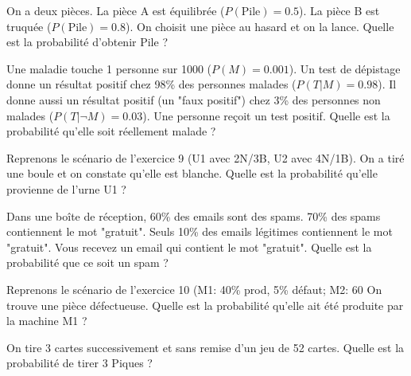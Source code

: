\begin{exercicebox}
On a deux pièces. La pièce A est équilibrée ($P(\text{Pile})=0.5$). La pièce B est truquée ($P(\text{Pile})=0.8$).
On choisit une pièce au hasard et on la lance. Quelle est la probabilité d'obtenir Pile ?
\end{exercicebox}


\begin{exercicebox}
Une maladie touche 1 personne sur 1000 ($P(M)=0.001$). Un test de dépistage donne un résultat positif chez 98\% des personnes malades ($P(T|M)=0.98$). Il donne aussi un résultat positif (un "faux positif") chez 3\% des personnes non malades ($P(T|\neg M)=0.03$).
Une personne reçoit un test positif. Quelle est la probabilité qu'elle soit réellement malade ?
\end{exercicebox}

\begin{exercicebox}
Reprenons le scénario de l'exercice 9 (U1 avec 2N/3B, U2 avec 4N/1B).
On a tiré une boule et on constate qu'elle est blanche. Quelle est la probabilité qu'elle provienne de l'urne U1 ?
\end{exercicebox}

\begin{exercicebox}
Dans une boîte de réception, 60\% des emails sont des spams. 70\% des spams contiennent le mot "gratuit". Seuls 10\% des emails légitimes contiennent le mot "gratuit".
Vous recevez un email qui contient le mot "gratuit". Quelle est la probabilité que ce soit un spam ?
\end{exercicebox}

\begin{exercicebox}
Reprenons le scénario de l'exercice 10 (M1: 40\% prod, 5\% défaut; M2: 60%
On trouve une pièce défectueuse. Quelle est la probabilité qu'elle ait été produite par la machine M1 ?
\end{exercicebox}


\begin{exercicebox}
On tire 3 cartes successivement et sans remise d'un jeu de 52 cartes.
Quelle est la probabilité de tirer 3 Piques ?
\end{exercicebox}

